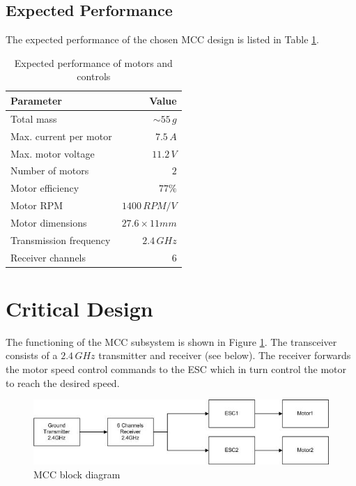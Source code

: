 \subsection{Expected Performance}
The expected performance of the chosen \ac{MCC} design is listed in Table \ref{tab:performance_mcc}.
%
\begin{table}[H]
\centering
\caption{Expected performance of motors and controls}
\label{tab:performance_mcc}
\begin{tabular}{l r}
\hline
\textbf{Parameter} & \textbf{Value}\\ \hline
Total mass & $\sim 55\,g$\\
Max. current per motor & $7.5\,A$ \\
Max. motor voltage & $11.2\,V$ \\
Number of motors & $2$ \\
Motor efficiency & $77 \%$ \\ 
Motor RPM & $1400\,RPM/V$\\
Motor dimensions & $27.6 \times 11 mm$ \\
Transmission frequency & $2.4\,GHz$\\
Receiver channels & $6$\\
\hline
\end{tabular}
\end{table}
%
%
\section{Critical Design}
%
The functioning of the \ac{MCC} subsystem is shown in Figure \ref{fig:design_block}. The transceiver consists of a $2.4\,GHz$ transmitter and receiver (see below). The receiver forwards the motor speed control commands to the \ac{ESC} which in turn control the motor to reach the desired speed.
%
\begin{figure}[h]
\centering
\includegraphics[scale=0.8]{figures/blockdiagram.jpg}
\caption{MCC block diagram}
\label{fig:design_block}
\end{figure}
%
